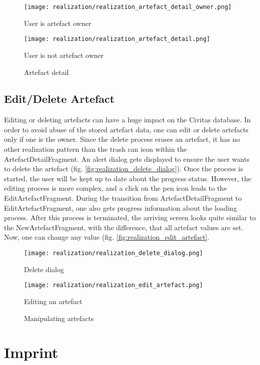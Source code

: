\begin{figure}[htb]
  \texttt{[image: realization/realization\_artefact\_detail\_owner.png]}
  \caption{User is artefact owner}\label{fig:realization_artefact_detail_owner}
\endminipage\hfill
{}
  \texttt{[image: realization/realization\_artefact\_detail.png]}
  \caption{User is not artefact owner}\label{fig:realization_artefact_detail}
\endminipage\hfill
\caption{Artefact detail}
\label{fig:artefact_detail}
\end{figure}

\subsection{Edit/Delete Artefact}
Editing or deleting artefacts can have a huge impact on the Civitas database. In order to avoid abuse of the stored artefact data, one can edit or delete artefacts only if one is the owner. Since the delete process erases an artefact, it has no other realization pattern than the trash can icon within the ArtefactDetailFragment. An alert dialog gets displayed to ensure the user wants to delete the artefact (fig. \ref{fig:realization_delete_dialog}). Once the process is started, the user will be kept up to date about the progress status. However, the editing process is more complex, and a click on the pen icon leads to the EditArtefactFragment. During the transition from ArtefactDetailFragment to EditArtefactFragment, one also gets progress information about the loading process. After this process is terminated, the arriving screen looks quite similar to the NewArtefactFragment, with the difference, that all artefact values are set. Now, one can change any value (fig. \ref{fig:realization_edit_artefact}.

\begin{figure}[H]
\centering
{}
  \texttt{[image: realization/realization\_delete\_dialog.png]}
  \caption[Delete dialog]{Delete dialog}\label{fig:realization_delete_dialog}
\endminipage\hfill
{}
  \texttt{[image: realization/realization\_edit\_artefact.png]}
  \caption[Editing an artefact]{Editing an artefact}
  \label{fig:realization_edit_artefact}
\endminipage\hfill
\caption{Manipulating artefacts}
\label{fig:artefact_edit_delete}
\end{figure}

\section{Imprint}


